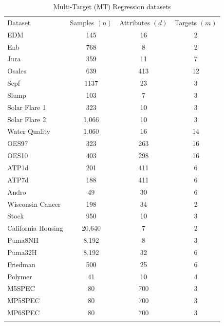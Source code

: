 \documentclass[reqno]{vcuthesis}
\numberwithin{equation}{chapter}
\begin{document}
\begin{table}[t!]
\centering \small
\caption{Multi-Target (MT) Regression datasets} \label{tab:mtrdatasets}
\begin{tabular}{lccc}
\noalign{\smallskip}\hline\noalign{\smallskip}
Dataset & Samples $(n)$ & Attributes $(d)$ & Targets $(m)$\\
\noalign{\smallskip}\hline\noalign{\smallskip}
EDM & 145 & 16 & 2\\
Enb & 768 & 8 & 2 \\
Jura & 359 & 11 & 7 \\
Osales & 639 & 413 & 12 \\
Scpf & 1137 & 23 & 3 \\
Slump & 103 & 7 & 3 \\
Solar Flare 1 & 323 & 10 & 3\\
Solar Flare 2 & 1,066 & 10 & 3\\
Water Quality & 1,060 & 16 & 14\\
OES97 & 323 & 263 & 16\\
OES10 & 403 & 298 & 16\\
ATP1d & 201 & 411 & 6\\
ATP7d & 188 & 411 & 6\\
Andro & 49 & 30 & 6 \\
Wisconsin Cancer & 198 & 34 & 2\\
Stock & 950 & 10 & 3\\
California Housing & 20,640 & 7 & 2\\
Puma8NH & 8,192 & 8 & 3\\
Puma32H & 8,192 & 32 & 6\\
Friedman & 500 & 25 & 6\\
Polymer & 41 & 10 & 4\\
M5SPEC & 80 & 700 & 3\\
MP5SPEC & 80 & 700 & 3\\
MP6SPEC & 80 & 700 & 3\\
\noalign{\smallskip}\hline\noalign{\smallskip}
\end{tabular}
\end{table}
\end{document}
